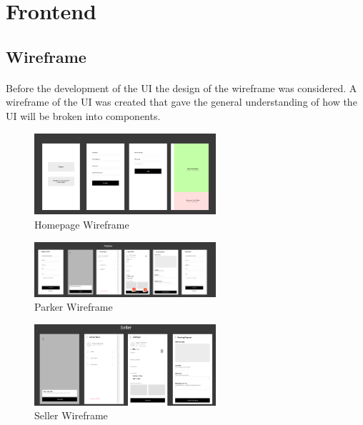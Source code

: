         \pagebreak

        \section{Frontend}
           \subsection{Wireframe}
                \paragraph*{}
                    Before the development of the UI the design of the wireframe was considered. A wireframe of the UI was created that gave the general understanding of how the UI will be broken into components.

                    \begin{figure}[h]
                        \centering
                        \includegraphics[width=0.6\textwidth]{images/homepageWireframe.png}
                        \caption{Homepage Wireframe}
                        \label{fig:homepageWireframe}
                    \end{figure}
 
                    \begin{figure}[h]
                        \centering
                        \includegraphics[width=0.6\textwidth]{images/parkerWireframe.png}
                        \caption{Parker Wireframe}
                        \label{fig:parkerWireframe}
                    \end{figure}

                    \begin{figure}[h]
                        \centering
                        \includegraphics[width=0.6\textwidth]{images/sellerWireframe.png}
                        \caption{Seller Wireframe}
                        \label{fig:sellerWireframe}
                    \end{figure}

